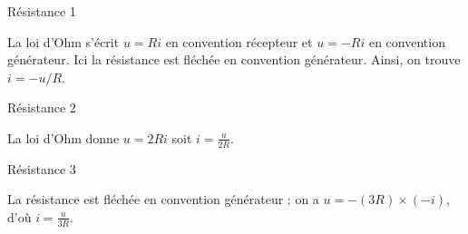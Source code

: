 
\begin{enonce}
Résistance 1
\end{enonce}


\begin{corrige}
	La loi d'Ohm s'écrit $u=Ri$ en convention récepteur et $u=-Ri$ en convention générateur. Ici la résistance est fléchée en convention générateur. Ainsi, on trouve $i=-u/R$.
\end{corrige}




\begin{enonce}
Résistance 2
\end{enonce}


\begin{corrige}
	La loi d'Ohm donne $u=2Ri$ soit $i=\frac{u}{2R}$.
\end{corrige}




\begin{enonce}
Résistance 3
\end{enonce}


\begin{corrige}
	La résistance est fléchée en convention générateur : on a $u=-(3R)\times (-i)$, d'où $i=\frac{u}{3R}$.
\end{corrige}


\finEntrainement





